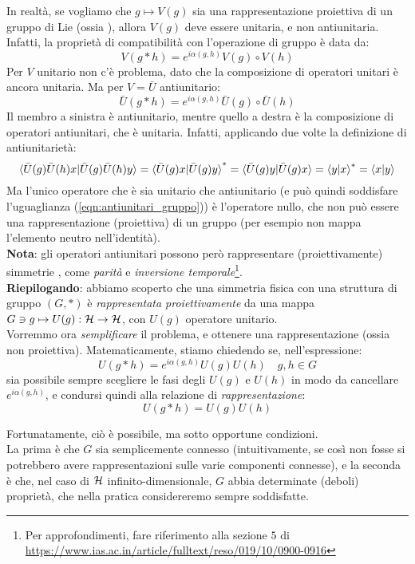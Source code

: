 \documentclass[../../FisicaTeorica.tex]{subfiles}
\begin{document}
In realtà, se vogliamo che $g \mapsto V(g)$ sia una rappresentazione proiettiva di un gruppo di Lie (ossia ), allora $V(g)$ deve essere unitaria, e non antiunitaria.\\
Infatti, la proprietà di compatibilità con l'operazione di gruppo è data da:
\[
V(g*h) = e^{i\alpha(g,h)}V(g)\circ V(h)
\]
Per $V$ unitario non c'è problema, dato che la composizione di operatori unitari è ancora unitaria. Ma per $V=\bar{U}$ antiunitario:
\begin{equation}
\bar{U}(g*h) = e^{i\alpha(g,h)}\bar{U}(g)\circ \bar{U}(h)
\label{eqn:antiunitari_gruppo}
\end{equation}
Il membro a sinistra è antiunitario, mentre quello a destra è la composizione di operatori antiunitari, che è unitaria. Infatti, applicando due volte la definizione di antiunitarietà:
\[
\braket{\bar{U}(g)\bar{U}(h) x|\bar{U}(g)\bar{U}(h)y} = \braket{\bar{U}(g) x | \bar{U}(g) y}^* = \braket{\bar{U}(g)y|\bar{U}(g)x} = \braket{y|x}^* = \braket{x|y}
\]
Ma l'unico operatore che è sia unitario che antiunitario (e può quindi soddisfare l'uguaglianza (\ref{eqn:antiunitari_gruppo})) è l'operatore nullo, che non può essere una rappresentazione (proiettiva) di un gruppo (per esempio non mappa l'elemento neutro nell'identità).\\

\textbf{Nota}: gli operatori antiunitari possono però rappresentare (proiettivamente) simmetrie , come \textit{parità} e \textit{inversione temporale}\footnote{Per approfondimenti, fare riferimento alla sezione $5$ di \url{https://www.ias.ac.in/article/fulltext/reso/019/10/0900-0916}}.\\

\textbf{Riepilogando}: abbiamo scoperto che una simmetria fisica con una struttura di gruppo $(G,*)$ è \textit{rappresentata proiettivamente} da una mappa $G\ni g\mapsto U(g):\mathcal{H} \to \mathcal{H}$, con $U(g)$ operatore unitario.\\

Vorremmo ora \textit{semplificare} il problema, e ottenere una rappresentazione  (ossia non proiettiva). Matematicamente, stiamo chiedendo se, nell'espressione:
\[
U(g*h)=e^{i\alpha(g,h)}U(g)U(h) \quad g,h \in G
\]
sia possibile sempre scegliere le fasi degli $U(g)$ e $U(h)$ in modo da cancellare $e^{i\alpha(g,h)}$, e condursi quindi alla relazione di \textit{rappresentazione}:
\[
U(g*h) = U(g)U(h)
\]

Fortunatamente, ciò è possibile, ma sotto opportune condizioni.\\
La prima è che $G$ sia semplicemente connesso (intuitivamente, se così non fosse si potrebbero avere rappresentazioni  sulle varie componenti connesse), e la seconda è che, nel caso di $\mathcal{H}$ infinito-dimensionale, $G$ abbia determinate (deboli) proprietà, che nella pratica considereremo sempre soddisfatte.\\
\end{document}
